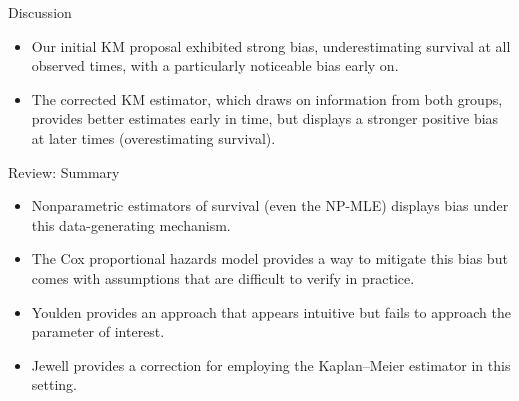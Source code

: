 \documentclass[12pt,t,handout]{beamer}
\begin{document}

\begin{frame}[c]{Discussion}

\begin{center}
\begin{itemize}
  \itemsep12pt
  \item Our initial KM proposal exhibited strong bias, underestimating survival
    at all observed times, with a particularly noticeable bias early on.
  \item The corrected KM estimator, which draws on information from both groups,
    provides better estimates early in time, but displays a stronger positive
    bias at later times (overestimating survival).
\end{itemize}
\end{center}

\note{
}

\end{frame}


\begin{frame}[c]{Review: Summary}

\begin{center}
\begin{itemize}
  \itemsep12pt
  \item Nonparametric estimators of survival (even the NP-MLE) displays bias
    under this data-generating mechanism.
  \item The Cox proportional hazards model provides a way to mitigate this bias
    but comes with assumptions that are difficult to verify in practice.
  \item Youlden provides an approach that appears intuitive but fails to
    approach the parameter of interest.
  \item Jewell provides a correction for employing the Kaplan--Meier estimator
    in this setting.
\end{itemize}
\end{center}


\end{frame}


\setbeamercovered{}
\beamerdefaultoverlayspecification{}
\end{document}
